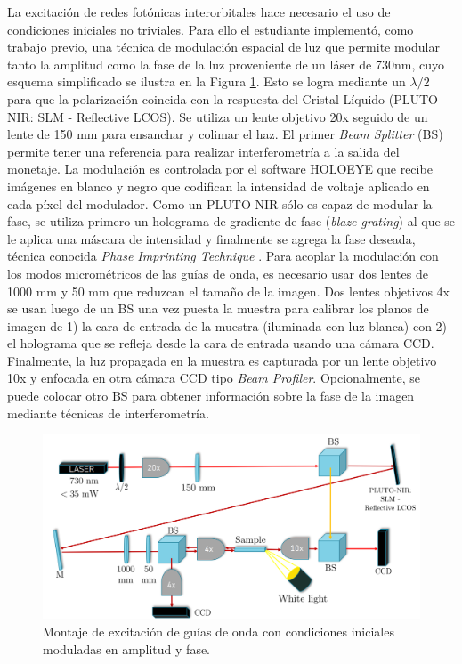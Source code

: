 \documentclass{article}
\begin{document}
La excitación de redes fotónicas interorbitales hace necesario el uso de condiciones iniciales no triviales. Para ello el estudiante implementó, como trabajo previo, una técnica de modulación espacial de luz que permite modular tanto la amplitud como la fase de la luz proveniente de un láser de 730nm, cuyo esquema simplificado se ilustra en la Figura \ref{fig:SLM}. Esto se logra mediante un $\lambda/2$ para que la polarización coincida con la respuesta del Cristal Líquido (PLUTO-NIR: SLM - Reflective LCOS). Se utiliza un lente objetivo 20x seguido de un lente de 150 mm para ensanchar y colimar el haz. El primer \textit{Beam Splitter} (BS) permite tener una referencia para realizar interferometría a la salida del monetaje. La modulación es controlada por el software HOLOEYE que recibe imágenes en blanco y negro que codifican la intensidad de voltaje aplicado en cada píxel del modulador. Como un PLUTO-NIR sólo es capaz de modular la fase, se utiliza primero un holograma de gradiente de fase (\textit{blaze grating}) al que se le aplica una máscara de intensidad y finalmente se agrega la fase deseada, técnica conocida \textit{Phase Imprinting Technique} \cite{slm}. Para acoplar la modulación con los modos micrométricos de las guías de onda, es necesario usar dos lentes de 1000 mm y 50 mm que reduzcan el tamaño de la imagen. Dos lentes objetivos 4x se usan luego de un BS una vez puesta la muestra para calibrar los planos de imagen de 1) la cara de entrada de la muestra (iluminada con luz blanca) con 2) el holograma que se refleja desde la cara de entrada usando una cámara CCD. Finalmente, la luz propagada en la muestra es capturada por un lente objetivo 10x y enfocada en otra cámara CCD tipo \textit{Beam Profiler}. Opcionalmente, se puede colocar otro BS para obtener información sobre la fase de la imagen mediante técnicas de interferometría.

\begin{figure}[H]
	\centering
	\includegraphics[width=0.7\linewidth]{./media/SLMsetup.png}
	\caption{Montaje de excitación de guías de onda con condiciones iniciales moduladas en amplitud y fase.\label{fig:SLM}}
\end{figure}
\end{document}
